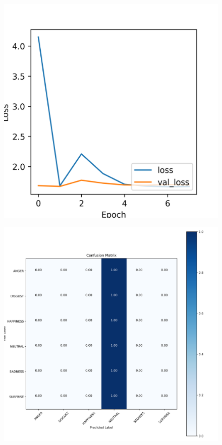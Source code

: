 \begin{figure}[H]
	\centering
	\includegraphics[width=.5\textwidth]{assets/results/preMELD.vgg/vgg16_finetune/learning_history-loss.png}
	
	\label{fig:figure11}
\end{figure}

\begin{figure}[H]
	\centering
	\includegraphics[width=.95\textwidth]{assets/results/preMELD.vgg/vgg16_finetune/confusion_matrix.png}
	
	\label{fig:cm5}
\end{figure}


